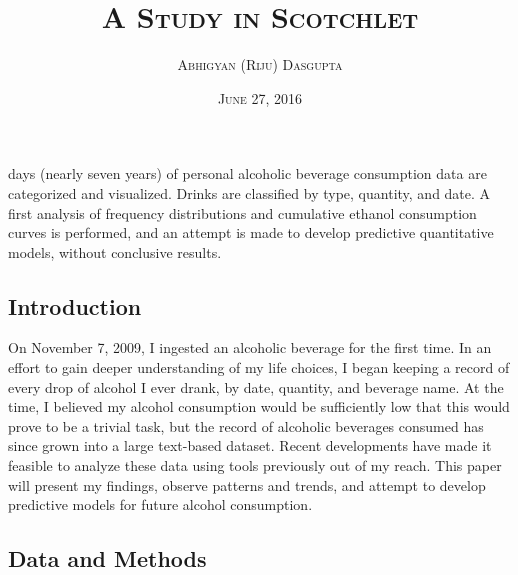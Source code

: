 \documentclass{article}
\title{\textsc{A Study in Scotchlet}}
\author{\textsc{Abhigyan (Riju) Dasgupta}}
\date{\textsc{June 27, 2016}}
\renewenvironment{abstract}
 {\small
  \begin{center}
  \bfseries \abstractname\vspace{-.5em}\vspace{0pt}
  \end{center}
  \list{}{
    \setlength{\leftmargin}{3cm}%
    \setlength{\rightmargin}{\leftmargin}%
  }%
  \item\relax}
 {\endlist}
\begin{document}
\maketitle
\begin{abstract}
2427 days (nearly seven years) of personal alcoholic beverage consumption data are categorized and visualized. Drinks are classified by type, quantity, and date. A first analysis of frequency distributions and cumulative ethanol consumption curves is performed, and an attempt is made to develop predictive quantitative models, without conclusive results.
\end{abstract}

\begin{multicols}{2}
\raggedcolumns
	\subsection*{Introduction}
	On November 7, 2009, I ingested an alcoholic beverage for the first time. In an effort to gain deeper understanding of my life choices, I began keeping a record of every drop of alcohol I ever drank, by date, quantity, and beverage name. At the time, I believed my alcohol consumption would be sufficiently low that this would prove to be a trivial task, but the record of alcoholic beverages consumed has since grown into a large text-based dataset. Recent developments have made it feasible to analyze these data using tools previously out of my reach. This paper will present my findings, observe patterns and trends, and attempt to develop predictive models for future alcohol consumption.

	\subsection*{Data and Methods}

\end{multicols}
\end{document}
